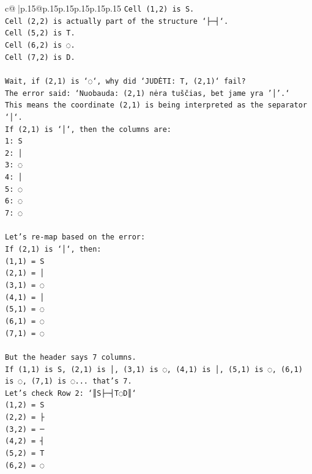\documentclass{article}
\begin{document}
{\begin{supertabular}{c@{$\;$}|p{.15\linewidth}@{}p{.15\linewidth}p{.15\linewidth}p{.15\linewidth}p{.15\linewidth}p{.15\linewidth}}
{{{\texttt{Cell (1,2) is S.} \\
\texttt{Cell (2,2) is actually part of the structure `├─┤`.} \\
\texttt{Cell (5,2) is T.} \\
\texttt{Cell (6,2) is ◌.} \\
\texttt{Cell (7,2) is D.} \\
\\ 
\texttt{Wait, if (2,1) is `◌`, why did `JUDĖTI: T, (2,1)` fail?} \\
\texttt{The error said: `Nuobauda: (2,1) nėra tuščias, bet jame yra '│'.`} \\
\texttt{This means the coordinate (2,1) is being interpreted as the separator `│`.} \\
\texttt{If (2,1) is `│`, then the columns are:} \\
\texttt{1: S} \\
\texttt{2: │} \\
\texttt{3: ◌} \\
\texttt{4: │} \\
\texttt{5: ◌} \\
\texttt{6: ◌} \\
\texttt{7: ◌} \\
\\ 
\texttt{Let's re{-}map based on the error:} \\
\texttt{If (2,1) is `│`, then:} \\
\texttt{(1,1) = S} \\
\texttt{(2,1) = │} \\
\texttt{(3,1) = ◌} \\
\texttt{(4,1) = │} \\
\texttt{(5,1) = ◌} \\
\texttt{(6,1) = ◌} \\
\texttt{(7,1) = ◌} \\
\\ 
\texttt{But the header says 7 columns.} \\
\texttt{If (1,1) is S, (2,1) is │, (3,1) is ◌, (4,1) is │, (5,1) is ◌, (6,1) is ◌, (7,1) is ◌... that's 7.} \\
\texttt{Let's check Row 2: `║S├─┤T◌D║`} \\
\texttt{(1,2) = S} \\
\texttt{(2,2) = ├} \\
\texttt{(3,2) = ─} \\
\texttt{(4,2) = ┤} \\
\texttt{(5,2) = T} \\
\texttt{(6,2) = ◌} \\
}}}
\end{supertabular}}
\end{document}
